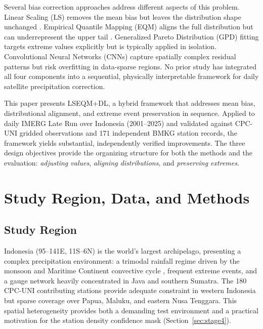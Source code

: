 \documentclass[11pt,a4paper]{article}
\begin{document}
Several bias correction approaches address different aspects of this
problem. Linear Scaling (LS) removes the mean bias but leaves the
distribution shape unchanged \cite{ref4}. Empirical Quantile Mapping (EQM)
aligns the full distribution but can underrepresent the upper tail
\cite{ref5,ref6}. Generalized Pareto Distribution (GPD) fitting targets
extreme values explicitly \cite{ref7} but is typically applied in isolation.
Convolutional Neural Networks (CNNs) capture spatially complex residual
patterns \cite{ref9,ref10} but risk overfitting in data-sparse regions.
No prior study has integrated all four components into a sequential,
physically interpretable framework for daily satellite precipitation
correction.

This paper presents LSEQM+DL, a hybrid framework that addresses mean
bias, distributional alignment, and extreme event preservation in
sequence. Applied to daily IMERG Late Run over Indonesia (2001--2025)
and validated against CPC-UNI gridded observations \cite{ref13} and 171
independent BMKG station records, the framework yields substantial,
independently verified improvements. The three design objectives provide
the organizing structure for both the methods and the evaluation:
\emph{adjusting values}, \emph{aligning distributions}, and
\emph{preserving extremes}.

\section{Study Region, Data, and Methods}\label{methods}

\subsection{Study Region}

Indonesia (95--141\textdegree E, 11\textdegree S--6\textdegree N) is the
world's largest archipelago, presenting a complex precipitation
environment: a trimodal rainfall regime driven by the monsoon and
Maritime Continent convective cycle \cite{ref19,ref20}, frequent extreme
events, and a gauge network heavily concentrated in Java and southern
Sumatra. The 180 CPC-UNI contributing stations provide adequate
constraint in western Indonesia but sparse coverage over Papua, Maluku,
and eastern Nusa Tenggara. This spatial heterogeneity provides both a
demanding test environment and a practical motivation for the station
density confidence mask (Section~\ref{sec:stage4}).
\end{document}

